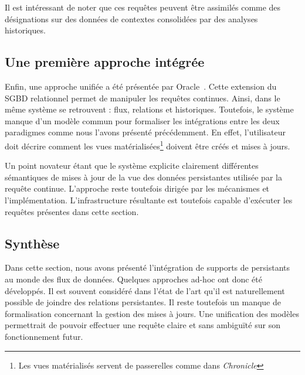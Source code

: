 Il est intéressant de noter que ces requêtes peuvent être assimilés comme des désignations sur des données de contextes consolidées par des analyses historiques.

\subsection{Une première approche intégrée}
Enfin, une approche unifiée a été présentée par Oracle~\cite{Witkowski:oraclecq}. Cette extension du SGBD relationnel permet de manipuler les requêtes continues. Ainsi, dans le même système se retrouvent : flux, relations et historiques. Toutefois, le système manque d'un modèle commun pour formaliser les intégrations entre les deux paradigmes comme nous l'avons présenté précédemment. En effet, l'utilisateur doit décrire comment les vues matérialisées\footnote{Les vues matérialisés servent de passerelles comme dans \textit{Chronicle}} doivent être créés et mises à jours. 

Un point novateur étant que le système explicite clairement différentes sémantiques de mises à jour de la vue des données persistantes utilisée par la requête continue. L'approche reste toutefois dirigée par les mécanismes et l'implémentation. L'infrastructure résultante est toutefois capable d'exécuter les requêtes présentes dans cette section.

\subsection{Synthèse}
Dans cette section, nous avons présenté l'intégration de supports de persistants au monde des flux de données. Quelques approches ad-hoc ont donc été développés. Il est souvent considéré dans l'état de l'art qu'il est naturellement possible de joindre des relations persistantes. Il reste toutefois un manque de formalisation concernant la gestion des mises à jours. Une unification des modèles permettrait de pouvoir effectuer une requête claire et sans ambiguïté sur son fonctionnement futur.
